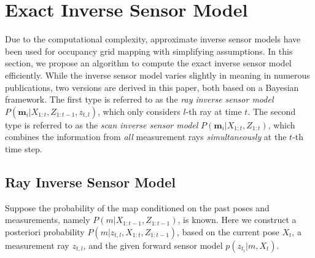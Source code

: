 \documentclass[letterpaper, 10pt, conference]{ieeeconf}
\begin{document}
	
	
\section{Exact Inverse Sensor Model}
\label{sec:ISM}

Due to the computational complexity, approximate inverse sensor models have been used for occupancy grid mapping with simplifying assumptions. In this section, we propose an algorithm to compute the exact inverse sensor model efficiently. 
While the inverse sensor model varies slightly in meaning in numerous publications, two versions are derived in this paper, both based on a Bayesian framework.
The first type is referred to as the \emph{ray inverse sensor model} $P(\mathbf{m}_i|X_{1:t},Z_{1:t-1},z_{t,l})$, which only considers $l$-th ray at time $t$.
The second type is referred to as the \emph{scan inverse sensor model} $P(\mathbf{m}_i|X_{1:t},Z_{1:t})$, which combines the information from \emph{all} measurement rays \emph{simultaneously} at the $t$-th time step.



\subsection{Ray Inverse Sensor Model}

Suppose the probability of the map conditioned on the past poses and measurements, namely $P(m|X_{1:t-1},Z_{1:t-1})$, is known. Here we construct a posteriori probability $P(m|z_{t,l},X_{1:t},Z_{1:t-1})$, based on the current pose $X_t$, a measurement ray $z_{t,l}$, and the given forward sensor model $p(z_{t_l}|m,X_t)$.
\end{document}
